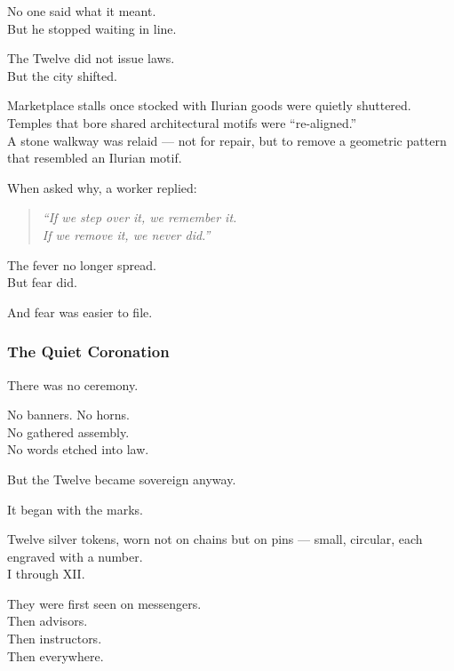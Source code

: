 \documentclass[12pt]{article}
\begin{document}
No one said what it meant.\\
But he stopped waiting in line.

\vspace{1em}

The Twelve did not issue laws.\\
But the city shifted.

Marketplace stalls once stocked with Ilurian goods were quietly shuttered.\\
Temples that bore shared architectural motifs were “re-aligned.”\\
A stone walkway was relaid — not for repair, but to remove a geometric pattern that resembled an Ilurian motif.

When asked why, a worker replied:

\begin{quote}
\textit{“If we step over it, we remember it.}\\
\textit{If we remove it, we never did.”}
\end{quote}

\vspace{1em}

The fever no longer spread.\\
But fear did.

And fear was easier to file.

\dotfill

\subsubsection*{The Quiet Coronation}

There was no ceremony.

No banners. No horns.\\
No gathered assembly.\\
No words etched into law.

But the Twelve became sovereign anyway.

\vspace{1em}

It began with the marks.

Twelve silver tokens, worn not on chains but on pins — small, circular, each engraved with a number.\\
I through XII.

They were first seen on messengers.\\
Then advisors.\\
Then instructors.\\
Then everywhere.
\end{document}
